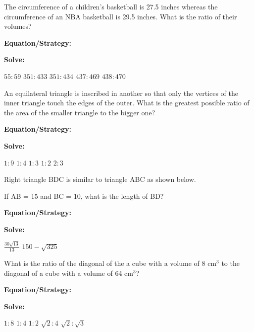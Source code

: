 \vfill
\newpage
\begin{multicols*}{2}
\begin{outline}[enumerate]
\medium

\1 The circumference of a children's basketball is 27.5 inches whereas the circumference of an NBA basketball is 29.5 inches. What is the ratio of their volumes?

\bigskip
\textbf{Equation/Strategy:} \hrulefill

\bigskip
\textbf{Solve:}

\vfill
\2 $55:59$
\2 $351:433$
\2 $351:434$
\2 $437:469$
\2 $438:470$

\midline

\1 An equilateral triangle is inscribed in another so that only the vertices of the inner triangle touch the edges of the outer. What is the greatest possible ratio of the area of the smaller triangle to the bigger one?

\bigskip
\textbf{Equation/Strategy:} \hrulefill

\bigskip
\textbf{Solve:}

\vfill
\2 $1:9$
\2 $1:4$
\2 $1:3$
\2 $1:2$
\2 $2:3$

\columnbreak
\advanced

\1 Right triangle BDC is similar to triangle ABC as shown below.

\begin{center}
\end{center}

If AB = 15 and BC = 10, what is the length of BD?

\bigskip
\textbf{Equation/Strategy:} \hrulefill

\bigskip
\textbf{Solve:}

\vfill
{}
\2 $\frac{30\sqrt{13}}{13}$
\2 $150-\sqrt{325}$

\midline

\1 What is the ratio of the diagonal of the a cube with a volume of 8 cm$^3$ to the diagonal of a cube with a volume of 64 cm$^3$?

\bigskip
\textbf{Equation/Strategy:}

\bigskip
\textbf{Solve:}

\vfill
\2 $1:8$
\2 $1:4$
\2 $1:2$
\2 $\sqrt{2}:4$
\2 $\sqrt{2}:\sqrt{3}$
\end{outline}
\end{multicols*}